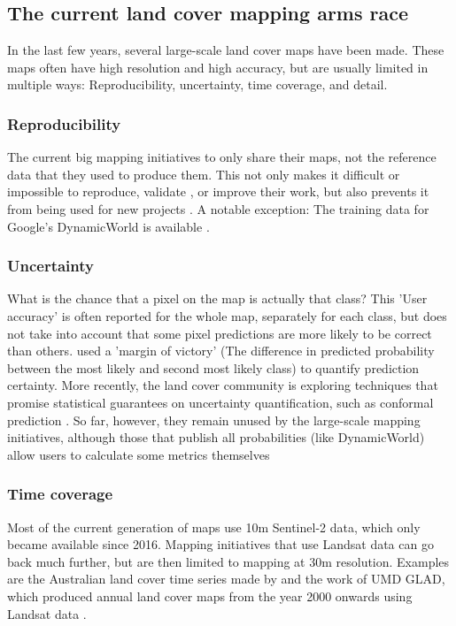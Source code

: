 \subsection*{The current land cover mapping arms race}
    
    In the last few years, several large-scale land cover maps have been made.
    These maps often have high resolution and high accuracy, but are usually limited in multiple ways: Reproducibility, uncertainty, time coverage, and detail.
    
    \subsubsection{Reproducibility}
        The current big mapping initiatives to only share their maps, not the reference data that they used to produce them. This not only makes it difficult or impossible to reproduce, validate \citep{venter2022global}, or improve their work, but also prevents it from being used for new projects \citep{tsendbazar2015assessing}.  A notable exception: The training data for Google's DynamicWorld \citet{brown2022dynamic} is available \citep{tait2021dwtd}.
    
    \subsubsection{Uncertainty} 
        What is the chance that a pixel on the map is actually that class? This 'User accuracy' is often reported for the whole map, separately for each class, but does not take into account that some pixel predictions are more likely to be correct than others. \citet{calderon2021high} used a 'margin of victory' (The difference in predicted probability between the most likely and second most likely class) to quantify prediction certainty. More recently, the land cover community is exploring techniques that promise statistical guarantees on uncertainty quantification, such as conformal prediction \citep{angelopoulos2023predictionpowered,valle2023quantifying,singh2024uncertainty}. So far, however, they remain unused by the large-scale mapping initiatives, although those that publish all probabilities (like DynamicWorld) allow users to calculate some metrics themselves
    
    \subsubsection{Time coverage} 
        Most of the current generation of maps use 10m  Sentinel-2 data, which only became available since 2016. Mapping initiatives that use Landsat data can go back much further, but are then limited to mapping at 30m resolution. Examples are the Australian land cover time series made by \citep{calderon2021high} and the work of UMD GLAD, which produced annual land cover maps from the year 2000 onwards using Landsat data \citep{hansen2022global}.
    
